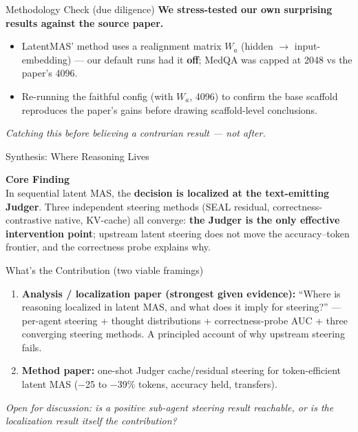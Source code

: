 \documentclass{beamer}
\begin{document}
\begin{frame}{Methodology Check (due diligence)}
    \textbf{We stress-tested our own surprising results against the source paper.}
    \begin{itemize}
        \item LatentMAS' method uses a realignment matrix $W_a$ (hidden $\rightarrow$ input-embedding) --- our default runs had it \textbf{off}; MedQA was capped at 2048 vs the paper's 4096.
        \item Re-running the faithful config (with $W_a$, 4096) to confirm the base scaffold reproduces the paper's gains before drawing scaffold-level conclusions.
    \end{itemize}
    \vspace{0.2cm}
    \begin{center}\textit{Catching this before believing a contrarian result --- not after.}\end{center}
\end{frame}

\begin{frame}{Synthesis: Where Reasoning Lives}
    \begin{center}
        \Large \textbf{Core Finding} \\
        \vspace{0.4cm}
        \normalsize
        In sequential latent MAS, the \textbf{decision is localized at the text-emitting Judger}. Three independent steering methods (SEAL residual, correctness-contrastive native, KV-cache) all converge: \textbf{the Judger is the only effective intervention point}; upstream latent steering does not move the accuracy--token frontier, and the correctness probe explains why.
    \end{center}
\end{frame}

\begin{frame}{What's the Contribution (two viable framings)}
    \begin{enumerate}
        \item \textbf{Analysis / localization paper (strongest given evidence):}
        ``Where is reasoning localized in latent MAS, and what does it imply for steering?'' --- per-agent steering + thought distributions + correctness-probe AUC + three converging steering methods. A principled account of why upstream steering fails.
        \item \textbf{Method paper:} one-shot Judger cache/residual steering for token-efficient latent MAS ($-$25 to $-$39\% tokens, accuracy held, transfers).
    \end{enumerate}
    \vspace{0.2cm}
    \textit{Open for discussion: is a positive sub-agent steering result reachable, or is the localization result itself the contribution?}
\end{frame}
\end{document}
